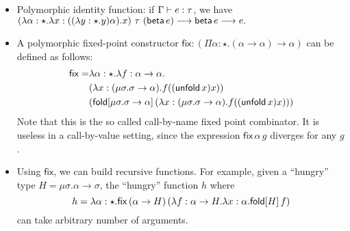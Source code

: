 \begin{itemize}
  \newcommand{\FPTypeU}{\mu\sigma . \sigma \to \alpha}
  \newcommand{\FPTermfxx}{\lambda x:(\FPTypeU).f((\unfold{x})x)}
  \newcommand{\FP}{\mathsf{fix}} %
\item Polymorphic identity function: if $\Gamma \vdash e:\tau$, we have
  $(\lambda \alpha:\star.\lambda x:((\lambda y:\star.y) \alpha).x)~\tau~(\mathsf{beta}\,e) \longrightarrow \mathsf{beta}\,e \longrightarrow e.$
\item A polymorphic fixed-point constructor
  $\FP:(\Pi \alpha:\star.(\alpha \to \alpha) \to \alpha)$ can be
  defined as follows:
  \begin{align*}
    \FP=&\lambda \alpha:\star . \lambda f:\alpha \to \alpha.\\
        &(\FPTermfxx)\\
        &(\fold{\FPTypeU}{(\FPTermfxx)})
  \end{align*}
  Note that this is the so called call-by-name fixed point
  combinator. It is useless in a call-by-value setting, since the
  expression $\FP\,\alpha\,g$ diverges for any $g$.
  \newcommand{\HGType}{\mu\sigma. \alpha \to \sigma}%
\item Using $\FP$, we can build recursive functions. For example,
  given a ``hungry'' type $H=\HGType$, the ``hungry'' function $h$
  where
  \[h=\lambda \alpha:\star.\FP\,(\alpha \to H)\,(\lambda f:\alpha \to
  H.\lambda x:\alpha.\fold{H}{f})\]
  can take arbitrary number of arguments.
\end{itemize}
